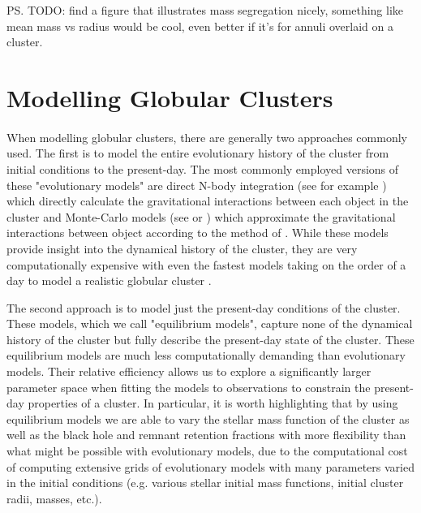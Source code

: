 \ps{TODO: find a figure that illustrates mass segregation nicely, something like mean mass vs radius
	would be cool, even better if it's for annuli overlaid on a cluster.}




\section{Modelling Globular Clusters}

\paragraph{}


When modelling globular clusters, there are generally two approaches commonly used. The first is to
model the entire evolutionary history of the cluster from initial conditions to the present-day. The
most commonly employed versions of these "evolutionary models" are direct N-body integration (see
for example \citet{Baumgardt2017a}) which directly calculate the gravitational interactions between
each object in the cluster and Monte-Carlo models (see \citet{Rodriguez2021} or \cite{Hypki2013})
which approximate the gravitational interactions between object according to the method of
\citet{Henon1971}. While these models provide insight into the dynamical history of the cluster,
they are very computationally expensive with even the fastest models taking on the order of a day to
model a realistic globular cluster \citep{Rodriguez2021}.

The second approach is to model just the present-day conditions of the cluster. These models, which
we call "equilibrium models", capture none of the dynamical history of the cluster but fully
describe the present-day state of the cluster. These equilibrium models are much less
computationally demanding than evolutionary models. Their relative efficiency allows us to explore a
significantly larger parameter space when fitting the models to observations to constrain the
present-day properties of a cluster. In particular, it is worth highlighting that by using
equilibrium models we are able to vary the stellar mass function of the cluster as well as the black
hole and remnant retention fractions with more flexibility than what might be possible with
evolutionary models, due to the computational cost of computing extensive grids of evolutionary
models with many parameters varied in the initial conditions (e.g. various stellar initial mass
functions, initial cluster radii, masses, etc.).

